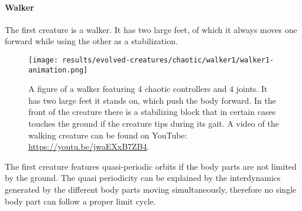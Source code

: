\documentclass[main]{subfiles}
\begin{document}
\paragraph{Walker}

The first creature is a walker. It has two large feet, of which it always moves one forward while using the other as a stabilization. 

\begin{figure}[H]
\centering
\texttt{[image: results/evolved-creatures/chaotic/walker1/walker1-animation.png]}
\caption[Figure of a walker using chaotic controllers.]{A figure of a walker featuring 4 chaotic controllers and 4 joints. It has two large feet it stands on, which push the body forward. In the front of the creature there is a stabilizing block that in certain cases touches the ground if the creature tips during its gait. A video of the walking creature can be found on YouTube: \url{https://youtu.be/jwaEXxB7ZB4}.}
\label{figure:successfulcreatures-chaotic-walker1}
\end{figure}

The first creature features quasi-periodic orbits if the body parts are not limited by the ground. %
%
The quasi periodicity can be explained by the interdynamics generated by the different body parts moving simultaneously, therefore no single body part can follow a proper limit cycle. %
\end{document}
